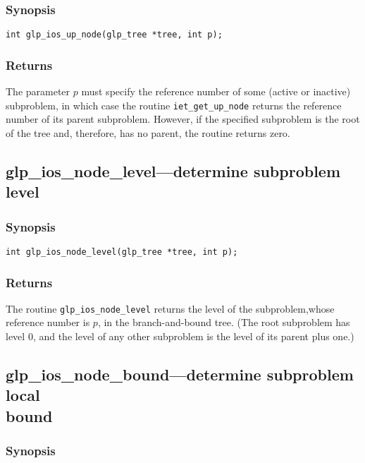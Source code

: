\subsubsection*{Synopsis}

\begin{verbatim}
int glp_ios_up_node(glp_tree *tree, int p);
\end{verbatim}

\subsubsection*{Returns}

The parameter $p$ must specify the reference number of some (active or
inactive) subproblem, in which case the routine \verb|iet_get_up_node|
returns the reference number of its parent subproblem. However, if the
specified subproblem is the root of the tree and, therefore, has
no parent, the routine returns zero.

\subsection{glp\_ios\_node\_level---determine subproblem level}

\subsubsection*{Synopsis}

\begin{verbatim}
int glp_ios_node_level(glp_tree *tree, int p);
\end{verbatim}

\subsubsection*{Returns}

The routine \verb|glp_ios_node_level| returns the level of the
subproblem,\linebreak whose reference number is $p$, in the
branch-and-bound tree. (The root subproblem has level 0, and the level
of any other subproblem is the level of its parent plus one.)

\subsection{glp\_ios\_node\_bound---determine subproblem local\\bound}

\subsubsection*{Synopsis}

